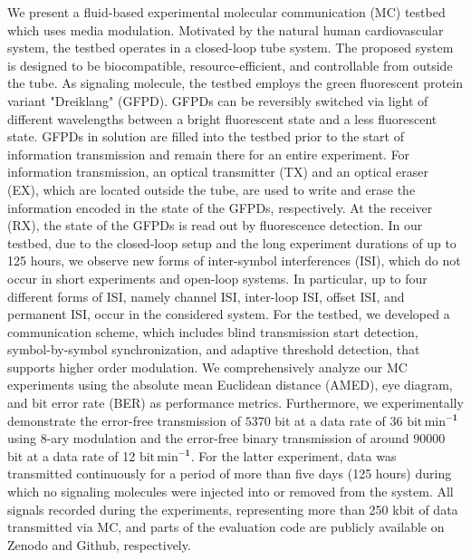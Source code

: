 We present a fluid-based experimental molecular communication (MC) testbed which uses media modulation. Motivated by the natural human cardiovascular system, the testbed operates in a closed-loop tube system.
The proposed system is designed to be biocompatible, resource-efficient, and controllable from outside the tube. As signaling molecule, the testbed employs the green fluorescent protein variant "Dreiklang" (GFPD). GFPDs can be reversibly switched via light of different wavelengths between a bright fluorescent state and a less fluorescent state. GFPDs in solution are filled into the testbed prior to the start of information transmission and remain there for an entire experiment. For information transmission, an optical transmitter (TX) and an optical eraser (EX), which are located outside the tube, are used to write and erase the information encoded in the state of the GFPDs, respectively. At the receiver (RX), the state of the GFPDs is read out by fluorescence detection.
In our testbed, due to the closed-loop setup and the long experiment durations of up to 125 hours, we observe new forms of inter-symbol interferences (ISI), which do not occur in short experiments and open-loop systems. In particular, up to four different forms of ISI, namely channel ISI, inter-loop ISI, offset ISI, and permanent ISI, occur in the considered system.
For the testbed, we developed a communication scheme, which includes blind transmission start detection, symbol-by-symbol synchronization, and adaptive threshold detection, that supports higher order modulation.
We comprehensively analyze our MC experiments using the absolute mean Euclidean distance (AMED), eye diagram, and bit error rate (BER) as performance metrics.
Furthermore, we experimentally demonstrate the error-free transmission of $\num{5370}$ bit at a data rate of 36 $\textrm{bit}\, \textrm{min}^{\boldsymbol{-1}}$ using 8-ary modulation and the error-free binary transmission of around $\num{90000}$ bit at a data rate of 12 $\textrm{bit}\, \textrm{min}^{\boldsymbol{-1}}$. For the latter experiment, data was transmitted continuously for a period of more than five days (125 hours) during which no signaling molecules were injected into or removed from the system.
All signals recorded during the experiments, representing more than 250 kbit of data transmitted via MC, and parts of the evaluation code are publicly available on Zenodo and Github, respectively.